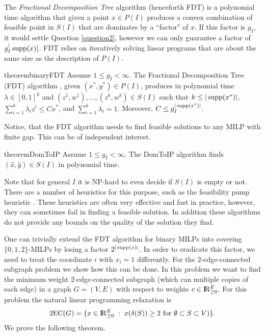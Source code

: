 The \textit{Fractional Decomposition Tree} algorithm (henceforth FDT) is a polynomial time algorithm that given a point $x\in P(I)$ produces a convex combination of feasible point in $S(I)$ that are dominates by a ``factor" of $x$. If this factor is $g_I$, it would settle Question \ref{question2}, however we can only guarantee a factor of $g_I^|\operatorname{supp}(x)|$. FDT relies on iteratively solving linear programs that are about the same size as the description of $P(I)$.

\begin{restatable}{theorem}{binaryFDT}
	\label{binaryFDT}
	Assume $1\leq g_I 	<\infty$. 	
	The Fractional Decomposition Tree (FDT) algorithm , given $(x^*,y^*)\in P(I)$, produces in polynomial time $\lambda\in [0,1]^k$ and $(z^1,w^1),\ldots,(z^k,w^k) \in S(I)$ such that $k\leq |\operatorname{supp}(x^*)|$, $\sum_{i=1}^{k}\lambda_i z^i\leq Cx^*$, and $\sum_{i=1}^{k}\lambda_i = 1$. Moreover, $C\leq g_I^{|\operatorname{supp}(x^*)|}$.
\end{restatable}

Notice, that the FDT algorithm needs to find feasible solutions to any MILP with finite gap. This can be of independent interest.
\begin{restatable}{theorem}{DomToIP}
	\label{domtoIP}
	Assume $1\leq g_I < \infty$. The DomToIP algorithm finds $(\hat{x},\hat{y})\in S(I)$ in polynomial time.
\end{restatable}


Note that for general $I$ it is NP-hard to even decide if $S(I)$ is empty or not. There are a number of heuristics for this purpose, such as the feasibility pump heuristic \cite{fp1,fp2}. These heuristics are often very effective and fast in practice, however, they can sometimes fail in finding a feasible solution. In addition these algorithms do not provide any bounds on the quality of the solution they find. 


One can trivially extend the FDT algorithm for binary MILPs into covering $\{0,1,2\}$-MILPs by losing a factor $2^{|\operatorname{supp}(x)|}$. In order to eradicate this factor, we need to treat the coordinate $i$ with $x_i=1$ differently. For  the 2-edge-connected subgraph problem we show how this can be done. In this problem we want to find the minimum weight 2-edge-connected subgraph (which can multiple copies of each edge) in a graph $G=(V,E)$ with respect to weights $c\in {\rm I\!R}^E_{\geq 0}$. For this problem the natural linear programming relaxation is
\begin{equation}\label{2ECpol}
\operatorname{2EC}(G)= \{x\in {\rm I\!R}_{\geq 0}^{E}\;:\; x(\delta(S))\geq 2 \text{ for $\emptyset \subset S\subset V$})\}.\end{equation}
We prove the following theorem.

